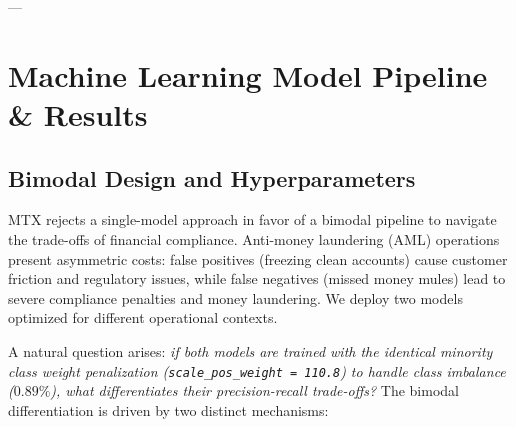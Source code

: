 \documentclass[11pt,a4paper]{article}
\begin{document}
---

\section{Machine Learning Model Pipeline \& Results}

\subsection{Bimodal Design and Hyperparameters}
MTX rejects a single-model approach in favor of a bimodal pipeline to navigate the trade-offs of financial compliance. Anti-money laundering (AML) operations present asymmetric costs: false positives (freezing clean accounts) cause customer friction and regulatory issues, while false negatives (missed money mules) lead to severe compliance penalties and money laundering. We deploy two models optimized for different operational contexts.

A natural question arises: \textit{if both models are trained with the identical minority class weight penalization (\texttt{scale\_pos\_weight = 110.8}) to handle class imbalance ($0.89\%$), what differentiates their precision-recall trade-offs?} The bimodal differentiation is driven by two distinct mechanisms:
\end{document}

